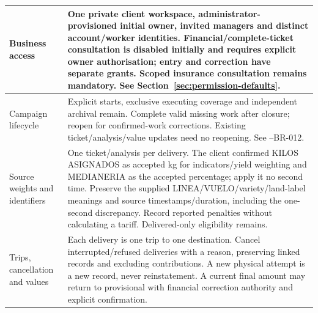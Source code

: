 {\begin{longtable}{L{0.24}L{0.76}}
\label{decision:D-01}\label{decision:D-09}\label{decision:Q-AA-01}\label{decision:D-16}\label{decision:D-21}Business access & One private client workspace, administrator-provisioned initial owner, invited managers and distinct account/worker identities. Financial/complete-ticket consultation is disabled initially and requires explicit owner authorisation; entry and correction have separate grants. Scoped insurance consultation remains mandatory. See Section~\ref{sec:permission-defaults}. \\
\midrule
{}\label{decision:D-02}\label{decision:D-03}\label{decision:D-04}\label{decision:D-05}\label{decision:D-06}\label{decision:D-23}\label{decision:D-24}Campaign lifecycle & Explicit starts, exclusive executing coverage and independent archival remain. Complete valid missing work after closure; reopen for confirmed-work corrections. Existing ticket/analysis/value updates need no reopening. See --BR-012. \\
\midrule
{}\label{decision:D-10}\label{decision:Q-DA-01}\label{decision:D-11}\label{decision:Q-DA-03}\label{decision:Q-DA-04}\label{decision:D-12}\label{decision:Q-DA-05}\label{decision:D-30}\label{decision:Q-DA-02}\label{decision:Q-DA-08}Source weights and identifiers & One ticket/analysis per delivery. The client confirmed KILOS ASIGNADOS as accepted kg for indicators/yield weighting and MEDIANERIA as the accepted percentage; apply it no second time. Preserve the supplied LINEA/VUELO/variety/land-label meanings and source timestamps/duration, including the one-second discrepancy. Record reported penalties without calculating a tariff. Delivered-only eligibility remains. \\
\midrule
{}\label{decision:D-13}\label{decision:Q-DA-06}\label{decision:Q-DA-07}\label{decision:Q-DA-09}\label{decision:Q-DA-10}Trips, cancellation and values & Each delivery is one trip to one destination. Cancel interrupted/refused deliveries with a reason, preserving linked records and excluding contributions. A new physical attempt is a new record, never reinstatement. A current final amount may return to provisional with financial correction authority and explicit confirmation. \\

\end{longtable}}
